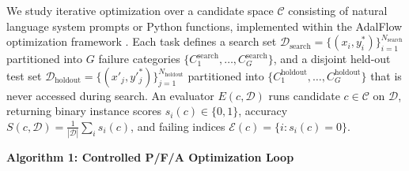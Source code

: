 \documentclass[10pt]{article}
\begin{document}
We study iterative optimization over a candidate space \(\mathcal{C}\)
consisting of natural language system prompts or Python functions,
implemented within the AdalFlow optimization framework
\citep{yin2025llmautodiff}. Each task defines a search set
\(\mathcal{D}_{\text{search}} = \{(x_i, y^*_i)\}_{i=1}^{N_{\text{search}}}\)
partitioned into \(G\) failure categories
\(\{C^{\text{search}}_1, \dots, C^{\text{search}}_G\}\), and a disjoint
held-out test set
\(\mathcal{D}_{\text{holdout}} = \{(x'_j, y'^*_j)\}_{j=1}^{N_{\text{holdout}}}\)
partitioned into
\(\{C^{\text{holdout}}_1, \dots, C^{\text{holdout}}_G\}\) that is never
accessed during search. An evaluator \(E(c, \mathcal{D})\) runs
candidate \(c \in \mathcal{C}\) on \(\mathcal{D}\), returning binary
instance scores \(s_i(c) \in \{0, 1\}\), accuracy
\(S(c, \mathcal{D}) = \frac{1}{|\mathcal{D}|}\sum_{i} s_i(c)\), and
failing indices \(\mathcal{E}(c) = \{i : s_i(c) = 0\}\).

\textbf{Algorithm 1: Controlled P/F/A Optimization Loop}
\end{document}
